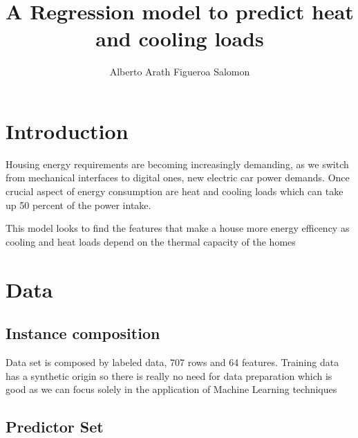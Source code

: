 \documentclass{article}
\title{A Regression model to predict heat and cooling loads}
\author{Alberto Arath Figueroa Salomon}
\begin{document}
\maketitle

\section{Introduction}

Housing energy requirements are becoming increasingly demanding, as we switch 
from mechanical interfaces to digital ones, new electric car power demands.
Once crucial aspect of energy consumption are heat and cooling loads which can 
take up 50 percent of the power intake.

This model looks to find the features that make a house more energy efficency
as cooling and heat loads depend on the thermal capacity of the homes

\section{Data}

\subsection{Instance composition}
Data set is composed by labeled data, 707 rows and 64 features.
Training data has a synthetic origin so there is really no need for data preparation
which is good as we can focus solely in the application of Machine Learning techniques


\subsection{Predictor Set}
\end{document}
